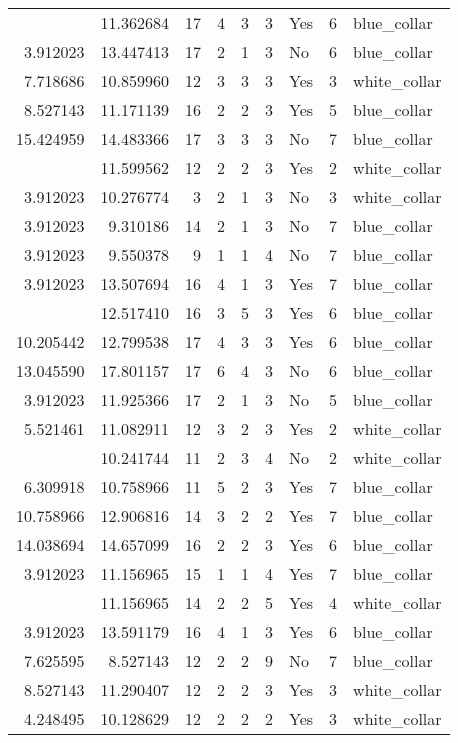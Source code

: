 \documentclass[
]{article}
\begin{document}
\begin{longtable}[t]{rrrrrllrl}
\addlinespace
8.486734 & 11.362684 & 17 & 4 & 3 & 3 & Yes & 6 & blue\_collar\\
3.912023 & 13.447413 & 17 & 2 & 1 & 3 & No & 6 & blue\_collar\\
7.718686 & 10.859960 & 12 & 3 & 3 & 3 & Yes & 3 & white\_collar\\
8.527143 & 11.171139 & 16 & 2 & 2 & 3 & Yes & 5 & blue\_collar\\
15.424959 & 14.483366 & 17 & 3 & 3 & 3 & No & 7 & blue\_collar\\
\addlinespace
7.047517 & 11.599562 & 12 & 2 & 2 & 3 & Yes & 2 & white\_collar\\
3.912023 & 10.276774 & 3 & 2 & 1 & 3 & No & 3 & white\_collar\\
3.912023 & 9.310186 & 14 & 2 & 1 & 3 & No & 7 & blue\_collar\\
3.912023 & 9.550378 & 9 & 1 & 1 & 4 & No & 7 & blue\_collar\\
3.912023 & 13.507694 & 16 & 4 & 1 & 3 & Yes & 7 & blue\_collar\\
\addlinespace
8.707814 & 12.517410 & 16 & 3 & 5 & 3 & Yes & 6 & blue\_collar\\
10.205442 & 12.799538 & 17 & 4 & 3 & 3 & Yes & 6 & blue\_collar\\
13.045590 & 17.801157 & 17 & 6 & 4 & 3 & No & 6 & blue\_collar\\
3.912023 & 11.925366 & 17 & 2 & 1 & 3 & No & 5 & blue\_collar\\
5.521461 & 11.082911 & 12 & 3 & 2 & 3 & Yes & 2 & white\_collar\\
\addlinespace
7.467371 & 10.241744 & 11 & 2 & 3 & 4 & No & 2 & white\_collar\\
6.309918 & 10.758966 & 11 & 5 & 2 & 3 & Yes & 7 & blue\_collar\\
10.758966 & 12.906816 & 14 & 3 & 2 & 2 & Yes & 7 & blue\_collar\\
14.038694 & 14.657099 & 16 & 2 & 2 & 3 & Yes & 6 & blue\_collar\\
3.912023 & 11.156965 & 15 & 1 & 1 & 4 & Yes & 7 & blue\_collar\\
\addlinespace
9.619133 & 11.156965 & 14 & 2 & 2 & 5 & Yes & 4 & white\_collar\\
3.912023 & 13.591179 & 16 & 4 & 1 & 3 & Yes & 6 & blue\_collar\\
7.625595 & 8.527143 & 12 & 2 & 2 & 9 & No & 7 & blue\_collar\\
8.527143 & 11.290407 & 12 & 2 & 2 & 3 & Yes & 3 & white\_collar\\
4.248495 & 10.128629 & 12 & 2 & 2 & 2 & Yes & 3 & white\_collar\\

\end{longtable}
\end{document}
